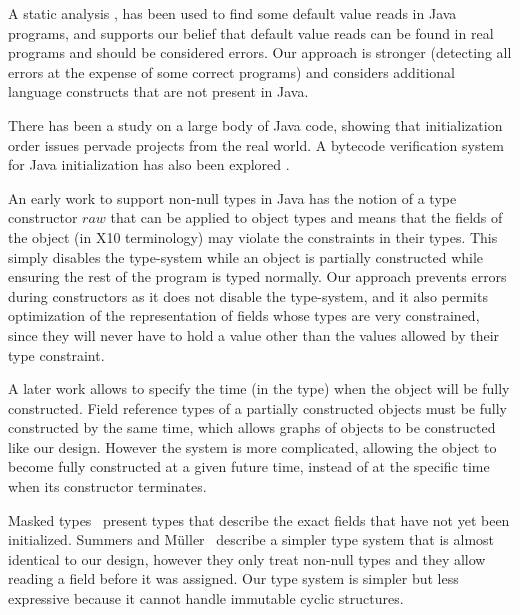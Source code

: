 A static analysis \cite{Seo:2007:SBD:1522565.1522587}, has been used to find
some default value reads in Java programs, and supports our belief that default
value reads can be found in real programs and should be considered errors.  Our
approach is stronger (detecting all errors at the expense of some correct
programs) and considers additional language constructs that are not present in
Java.

There has been a study on a large body \cite{Gil:2009:WRS:1615184.1615216} of
Java code, showing that initialization order issues pervade projects from the
real world.  A bytecode verification system for Java initialization has also
been explored \cite{Hubert:2010:ESO:1888881.1888890}.

An early work to support non-null types in Java
\cite{Fahndrich:2003:DCN:949305.949332} has the notion of a type constructor
$raw$ that can be applied to object types and means that the fields of the
object (in X10 terminology) may violate the constraints in their types.  This
simply disables the type-system while an object is partially constructed while
ensuring the rest of the program is typed normally.  Our approach prevents
errors during constructors as it does not disable the type-system, and it also
permits optimization of the representation of fields whose types are very
constrained, since they will never have to hold a value other than the values
allowed by their type constraint.

A later work \cite{Fahndrich:2007:EOI:1297027.1297052,XinQi:2009} allows
    to specify the time
    (in the type) when the object will be fully constructed.
Field reference types of a partially constructed objects must be fully
constructed by the same time, which allows graphs of objects to be constructed
like our  design.  However the system is more complicated, allowing
the object to become fully constructed at a given future time, instead of at
the specific time when its constructor terminates.

Masked types~\cite{XinQi:2009} present types that
    describe the exact fields that have not yet been initialized.
Summers and M{\"u}ller~\cite{Summers:Mulller:2007} describe a simpler type system that is almost identical to our  design,
    however they only treat non-null types and they allow reading a field before it was assigned.
Our type system is simpler but less expressive because it cannot handle immutable cyclic structures.

